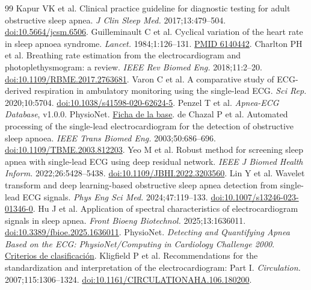 \documentclass[10pt,a4paper]{article}
\begin{document}
{\footnotesize
\begin{thebibliography}{99}
\setlength{\itemsep}{1pt}
\setlength{\parsep}{0pt}
 Kapur VK et al. Clinical practice guideline for diagnostic testing for adult obstructive sleep apnea. \emph{J Clin Sleep Med.} 2017;13:479--504. \href{https://doi.org/10.5664/jcsm.6506}{doi:10.5664/jcsm.6506}.
 Guilleminault C et al. Cyclical variation of the heart rate in sleep apnoea syndrome. \emph{Lancet.} 1984;1:126--131. \href{https://pubmed.ncbi.nlm.nih.gov/6140442/}{PMID 6140442}.
 Charlton PH et al. Breathing rate estimation from the electrocardiogram and photoplethysmogram: a review. \emph{IEEE Rev Biomed Eng.} 2018;11:2--20. \href{https://doi.org/10.1109/RBME.2017.2763681}{doi:10.1109/RBME.2017.2763681}.
 Varon C et al. A comparative study of ECG-derived respiration in ambulatory monitoring using the single-lead ECG. \emph{Sci Rep.} 2020;10:5704. \href{https://doi.org/10.1038/s41598-020-62624-5}{doi:10.1038/s41598-020-62624-5}.
 Penzel T et al. \emph{Apnea-ECG Database}, v1.0.0. PhysioNet. \href{https://physionet.org/content/apnea-ecg/1.0.0/}{Ficha de la base}.
 de Chazal P et al. Automated processing of the single-lead electrocardiogram for the detection of obstructive sleep apnoea. \emph{IEEE Trans Biomed Eng.} 2003;50:686--696. \href{https://doi.org/10.1109/TBME.2003.812203}{doi:10.1109/TBME.2003.812203}.
 Yeo M et al. Robust method for screening sleep apnea with single-lead ECG using deep residual network. \emph{IEEE J Biomed Health Inform.} 2022;26:5428--5438. \href{https://doi.org/10.1109/JBHI.2022.3203560}{doi:10.1109/JBHI.2022.3203560}.
 Lin Y et al. Wavelet transform and deep learning-based obstructive sleep apnea detection from single-lead ECG signals. \emph{Phys Eng Sci Med.} 2024;47:119--133. \href{https://doi.org/10.1007/s13246-023-01346-0}{doi:10.1007/s13246-023-01346-0}.
 Hu J et al. Application of spectral characteristics of electrocardiogram signals in sleep apnea. \emph{Front Bioeng Biotechnol.} 2025;13:1636011. \href{https://doi.org/10.3389/fbioe.2025.1636011}{doi:10.3389/fbioe.2025.1636011}.
 PhysioNet. \emph{Detecting and Quantifying Apnea Based on the ECG: PhysioNet/Computing in Cardiology Challenge 2000}. \href{https://physionet.org/content/challenge-2000/1.0.0/}{Criterios de clasificación}.
 Kligfield P et al. Recommendations for the standardization and interpretation of the electrocardiogram: Part I. \emph{Circulation.} 2007;115:1306--1324. \href{https://doi.org/10.1161/CIRCULATIONAHA.106.180200}{doi:10.1161/CIRCULATIONAHA.106.180200}.

\end{thebibliography}}
\end{document}
